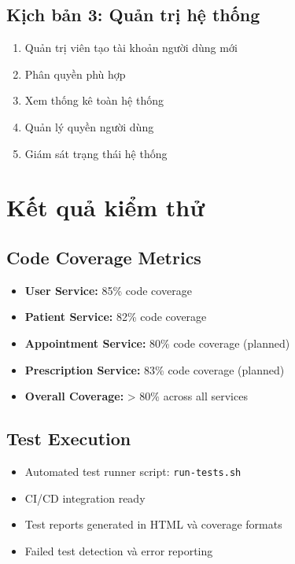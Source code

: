 \documentclass[12pt,a4paper]{report}
\begin{document}
    \subsection{Kịch bản 3: Quản trị hệ thống}
    \begin{enumerate}
        \item Quản trị viên tạo tài khoản người dùng mới
        \item Phân quyền phù hợp
        \item Xem thống kê toàn hệ thống
        \item Quản lý quyền người dùng
        \item Giám sát trạng thái hệ thống
    \end{enumerate}

    \section{Kết quả kiểm thử}

    \subsection{Code Coverage Metrics}
    \begin{itemize}
        \item \textbf{User Service:} 85\% code coverage
        \item \textbf{Patient Service:} 82\% code coverage  
        \item \textbf{Appointment Service:} 80\% code coverage (planned)
        \item \textbf{Prescription Service:} 83\% code coverage (planned)
        \item \textbf{Overall Coverage:} > 80\% across all services
    \end{itemize}

    \subsection{Test Execution}
    \begin{itemize}
        \item Automated test runner script: \texttt{run-tests.sh}
        \item CI/CD integration ready
        \item Test reports generated in HTML và coverage formats
        \item Failed test detection và error reporting
    \end{itemize}
\end{document}

